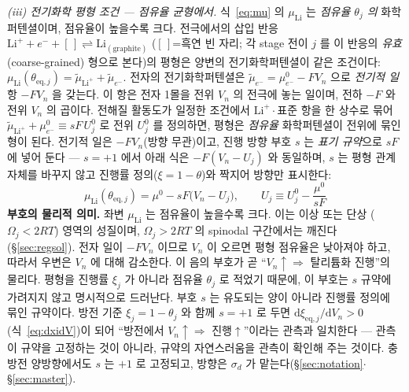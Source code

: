 \documentclass[11pt,a4paper]{article}
\newcommand{\dd}{\mathrm{d}}
\newcommand{\eq}{\mathrm{eq}}
\begin{document}
\emph{(iii) 전기화학 평형 조건 — 점유율 균형에서.} 식~\eqref{eq:mu} 의 $\mu_\mathrm{Li}$ 는 \emph{점유율
$\theta_j$ 의} 화학퍼텐셜이며, 점유율이 높을수록 크다. 전극에서의 삽입 반응 $\mathrm{Li}^++e^-+[\,]\rightleftharpoons
\mathrm{Li}_{(\text{graphite})}$ ($[\,]$=흑연 빈 자리; 각 stage 전이 $j$ 를 이 반응의 \emph{유효}(coarse-grained)
형으로 본다)의 평형은 양변의 전기화학퍼텐셜이 같은 조건이다: $\mu_\mathrm{Li}(\theta_{\eq,j})=\tilde\mu_{\mathrm{Li}^+}
+\tilde\mu_{e^-}$. 전자의 전기화학퍼텐셜은 $\tilde\mu_{e^-}=\mu_{e^-}^0-FV_n$ 으로 \emph{전기적 일} 항 $-FV_n$ 을
갖는다. 이 항은 전자 1몰을 전위 $V_n$ 의 전극에 놓는 일이며, 전하 $-F$ 와 전위 $V_n$ 의 곱이다. 전해질 활동도가
일정한 조건에서
$\mathrm{Li}^+\cdot$표준 항을 한 상수로 묶어 $\tilde\mu_{\mathrm{Li}^+}+\mu_{e^-}^0\equiv sF\,U_j^0$ 로 전위 $U_j^0$ 를
정의하면, 평형은 \emph{점유율} 화학퍼텐셜이 전위에 묶인 형이 된다. 전기적 일은 $-FV_n$(방향 무관)이고, 진행 방향
부호 $s$ 는 \emph{표기 규약}으로 $sF$ 에 넣어 둔다 — $s=+1$ 에서 아래 식은 $-F(V_n-U_j)$ 와 동일하며, $s$ 는 평형
관계 자체를 바꾸지 않고 진행률 정의($\xi=1-\theta$)와 짝지어 방향만 표시한다:
\begin{equation}
\mu_\mathrm{Li}(\theta_{\eq,j})=\mu^0-sF\big(V_n-U_j\big),\qquad U_j\equiv U_j^0-\frac{\mu^0}{sF}
\label{eq:eqcond}
\end{equation}
\textbf{부호의 물리적 의미.} 좌변 $\mu_\mathrm{Li}$ 는 점유율이 높을수록 크다. 이는 이상 또는 단상
($\Omega_j<2RT$) 영역의 성질이며, $\Omega_j>2RT$ 의 spinodal 구간에서는 깨진다(\S\ref{sec:regsol}). 전자 일이
$-FV_n$ 이므로 $V_n$ 이 오르면 평형 점유율은 낮아져야 하고, 따라서 우변은 $V_n$ 에 대해 감소한다. 이 음의 부호가
곧 ``$V_n\uparrow\Rightarrow$ 탈리튬화 진행''의 물리다. 평형을 진행률 $\xi_j$ 가 아니라 점유율 $\theta_j$ 로
적었기 때문에, 이 부호는 $s$ 규약에 가려지지 않고 명시적으로 드러난다. 부호 $s$ 는 유도되는 양이 아니라 진행률
정의에 묶인 규약이다. 방전 기준 $\xi_j=1-\theta_j$ 와 함께 $s=+1$ 로 두면 $\dd\xi_{\eq,j}/\dd V_n>0$
(식~\eqref{eq:dxidV})이 되어 ``방전에서 $V_n\uparrow\Rightarrow$ 진행$\uparrow$''이라는 관측과 일치한다 — 관측이
규약을 고정하는 것이 아니라, 규약의 자연스러움을 관측이 확인해 주는 것이다. 충방전 양방향에서도 $s$ 는 $+1$ 로
고정되고, 방향은 $\sigma_d$ 가 맡는다(\S\ref{sec:notation}$\cdot$\S\ref{sec:master}).
\end{document}

